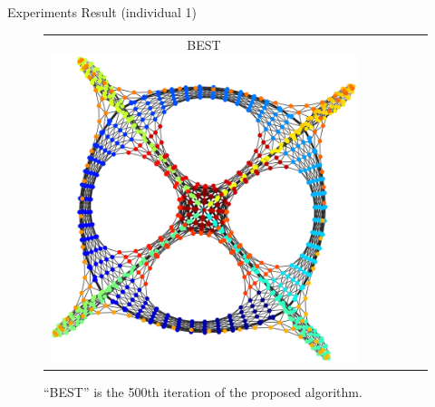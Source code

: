 \documentclass[dvipdfmx,13pt,aspectratio=169]{beamer}
\newif\ifShowHidden
\begin{document}
\begin{frame}{Experiments Result (individual 1)}
\begin{figure}[h]
\begin{tabular}{cccccc}
        \makecell{\small{\textsf{BEST}}                                                                                                                     \\[-0.2em]\includegraphics[width=0.135\columnwidth]{../main/individual/vis/opt_dwt_1005.png}} \\
      \end{tabular}
      \caption{``BEST'' is the 500th iteration of the proposed algorithm.}
    \end{figure}
  \end{frame}
\fi

\ifShowHidden
\end{document}
